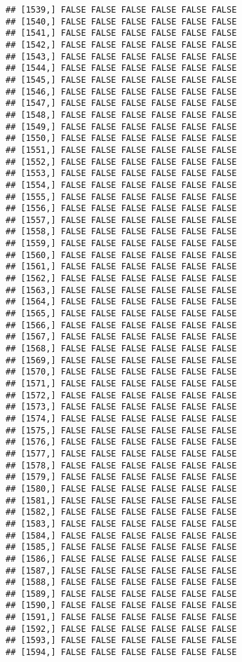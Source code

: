 \documentclass[
]{article}
\begin{document}
\begin{verbatim}
## [1539,] FALSE FALSE FALSE FALSE FALSE FALSE
## [1540,] FALSE FALSE FALSE FALSE FALSE FALSE
## [1541,] FALSE FALSE FALSE FALSE FALSE FALSE
## [1542,] FALSE FALSE FALSE FALSE FALSE FALSE
## [1543,] FALSE FALSE FALSE FALSE FALSE FALSE
## [1544,] FALSE FALSE FALSE FALSE FALSE FALSE
## [1545,] FALSE FALSE FALSE FALSE FALSE FALSE
## [1546,] FALSE FALSE FALSE FALSE FALSE FALSE
## [1547,] FALSE FALSE FALSE FALSE FALSE FALSE
## [1548,] FALSE FALSE FALSE FALSE FALSE FALSE
## [1549,] FALSE FALSE FALSE FALSE FALSE FALSE
## [1550,] FALSE FALSE FALSE FALSE FALSE FALSE
## [1551,] FALSE FALSE FALSE FALSE FALSE FALSE
## [1552,] FALSE FALSE FALSE FALSE FALSE FALSE
## [1553,] FALSE FALSE FALSE FALSE FALSE FALSE
## [1554,] FALSE FALSE FALSE FALSE FALSE FALSE
## [1555,] FALSE FALSE FALSE FALSE FALSE FALSE
## [1556,] FALSE FALSE FALSE FALSE FALSE FALSE
## [1557,] FALSE FALSE FALSE FALSE FALSE FALSE
## [1558,] FALSE FALSE FALSE FALSE FALSE FALSE
## [1559,] FALSE FALSE FALSE FALSE FALSE FALSE
## [1560,] FALSE FALSE FALSE FALSE FALSE FALSE
## [1561,] FALSE FALSE FALSE FALSE FALSE FALSE
## [1562,] FALSE FALSE FALSE FALSE FALSE FALSE
## [1563,] FALSE FALSE FALSE FALSE FALSE FALSE
## [1564,] FALSE FALSE FALSE FALSE FALSE FALSE
## [1565,] FALSE FALSE FALSE FALSE FALSE FALSE
## [1566,] FALSE FALSE FALSE FALSE FALSE FALSE
## [1567,] FALSE FALSE FALSE FALSE FALSE FALSE
## [1568,] FALSE FALSE FALSE FALSE FALSE FALSE
## [1569,] FALSE FALSE FALSE FALSE FALSE FALSE
## [1570,] FALSE FALSE FALSE FALSE FALSE FALSE
## [1571,] FALSE FALSE FALSE FALSE FALSE FALSE
## [1572,] FALSE FALSE FALSE FALSE FALSE FALSE
## [1573,] FALSE FALSE FALSE FALSE FALSE FALSE
## [1574,] FALSE FALSE FALSE FALSE FALSE FALSE
## [1575,] FALSE FALSE FALSE FALSE FALSE FALSE
## [1576,] FALSE FALSE FALSE FALSE FALSE FALSE
## [1577,] FALSE FALSE FALSE FALSE FALSE FALSE
## [1578,] FALSE FALSE FALSE FALSE FALSE FALSE
## [1579,] FALSE FALSE FALSE FALSE FALSE FALSE
## [1580,] FALSE FALSE FALSE FALSE FALSE FALSE
## [1581,] FALSE FALSE FALSE FALSE FALSE FALSE
## [1582,] FALSE FALSE FALSE FALSE FALSE FALSE
## [1583,] FALSE FALSE FALSE FALSE FALSE FALSE
## [1584,] FALSE FALSE FALSE FALSE FALSE FALSE
## [1585,] FALSE FALSE FALSE FALSE FALSE FALSE
## [1586,] FALSE FALSE FALSE FALSE FALSE FALSE
## [1587,] FALSE FALSE FALSE FALSE FALSE FALSE
## [1588,] FALSE FALSE FALSE FALSE FALSE FALSE
## [1589,] FALSE FALSE FALSE FALSE FALSE FALSE
## [1590,] FALSE FALSE FALSE FALSE FALSE FALSE
## [1591,] FALSE FALSE FALSE FALSE FALSE FALSE
## [1592,] FALSE FALSE FALSE FALSE FALSE FALSE
## [1593,] FALSE FALSE FALSE FALSE FALSE FALSE
## [1594,] FALSE FALSE FALSE FALSE FALSE FALSE

\end{verbatim}
\end{document}
